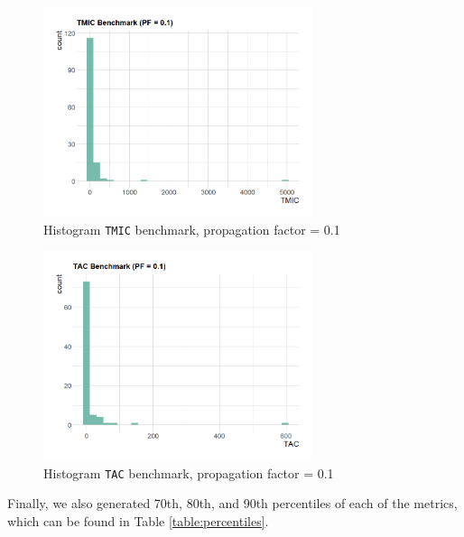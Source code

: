 \begin{figure}[ht!]
\begin{center}
  \includegraphics[width=0.7\textwidth]{figures/benchmark/TMIC_PF_0.1.png}
  \caption{Histogram \texttt{TMIC} benchmark, propagation factor = 0.1}
  \label{fig:TMIC-benchmark-0.1}
\end{center}
\end{figure}

\begin{figure}[ht!]
\begin{center}
\includegraphics[width=0.7\textwidth]{figures/benchmark/TAC_PF_0.1.png}
\caption{Histogram \texttt{TAC} benchmark, propagation factor = 0.1}
\label{fig:TAC-benchmark-0.1}
\end{center}
\end{figure}

Finally, we also generated 70th, 80th, and 90th percentiles of each of the metrics, which can be found in Table \ref{table:percentiles}.

